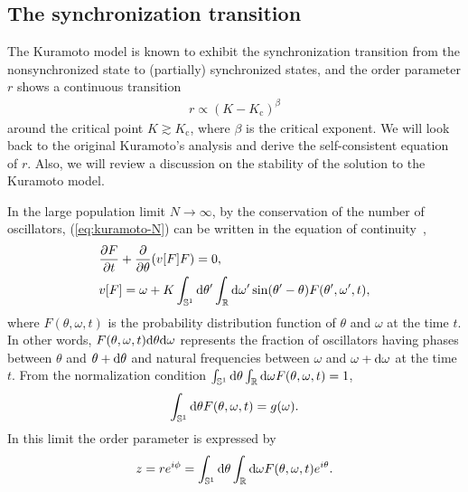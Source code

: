 
\subsection{The synchronization transition}
The Kuramoto model is known to exhibit the synchronization transition
from the nonsynchronized state to (partially) synchronized states,
and the order parameter $r$ shows a continuous transition
\begin{align}
  r\propto(K-K_{\mathrm{c}})^{\beta}
\end{align}
around the critical point $K\gtrsim K_{\mathrm{c}}$,
where $\beta$ is the critical exponent.
We will look back to the original Kuramoto's analysis
and derive the self-consistent equation of $r$.
Also, we will review a discussion on the stability of the solution to the Kuramoto model.

In the large population limit $N\to\infty$,
by the conservation of the number of oscillators,
(\ref{eq:kuramoto-N}) can be written in the equation of continuity~\cite{lancellotti2004},
\begin{align}
  &\frac{\partial F}{\partial t}+\frac{\partial}{\partial\theta}(v[F]F)=0,\label{eq:eq-cont}\\
  &v[F]=\omega+K\int_{\mathbb{S}^{1}}\mathrm{d}\theta'\int_{\mathbb{R}}\mathrm{d}\omega'\sin(\theta'-\theta)F(\theta',\omega',t)\label{eq:vector-field},
\end{align}
where $F(\theta,\omega,t)$ is the probability distribution function
of $\theta$ and $\omega$ at the time $t$.
In other words, $F(\theta,\omega,t)\mathrm{d}\theta\mathrm{d}\omega$
represents the fraction of oscillators having phases
between $\theta$ and $\theta+\mathrm{d}\theta$
and natural frequencies between $\omega$ and $\omega+\mathrm{d}\omega$ at the time $t$.
From the normalization condition $\int_{\mathbb{S}^{1}}\mathrm{d}\theta\int_{\mathbb{R}}\mathrm{d}\omega F(\theta,\omega,t)=1$,
\begin{align}
  \int_{\mathbb{S}^{1}}\mathrm{d}\theta F(\theta,\omega,t)=g(\omega).
  \label{eq:normal}
\end{align}
In this limit the order parameter is expressed by
\begin{align}
  z=re^{i\phi}=\int_{\mathbb{S}^{1}}\mathrm{d}\theta\int_{\mathbb{R}}\mathrm{d}\omega F(\theta,\omega,t)e^{i\theta}.
\end{align}

